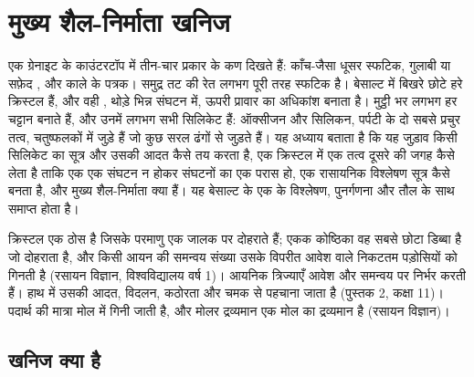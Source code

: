 \chapter{मुख्य शैल-निर्माता खनिज}\label{ch:b1:rock-forming-minerals}

एक ग्रेनाइट के काउंटरटॉप में तीन-चार प्रकार के कण दिखते हैं: काँच-जैसा धूसर स्फटिक, गुलाबी या सफ़ेद ,
और काले  के पत्रक। समुद्र तट की रेत लगभग पूरी तरह स्फटिक है। बेसाल्ट में बिखरे छोटे हरे क्रिस्टल 
हैं, और वही , थोड़े भिन्न संघटन में, ऊपरी प्रावार का अधिकांश बनाता है। मुट्ठी भर  लगभग हर चट्टान
बनाते हैं, और उनमें लगभग सभी सिलिकेट हैं: ऑक्सीजन और सिलिकन, पर्पटी के दो सबसे प्रचुर तत्व, चतुष्फलकों में
जुड़े हैं जो कुछ सरल ढंगों से जुड़ते हैं। यह अध्याय बताता है कि यह जुड़ाव किसी सिलिकेट का सूत्र और उसकी
आदत कैसे तय करता है, एक क्रिस्टल में एक तत्व दूसरे की जगह कैसे लेता है ताकि एक  एक संघटन न होकर संघटनों
का एक परास हो, एक रासायनिक विश्लेषण सूत्र कैसे बनता है, और मुख्य शैल-निर्माता  क्या हैं। यह बेसाल्ट के
एक  के विश्लेषण, पुनर्गणना और तौल के साथ समाप्त होता है।

\begin{recall}
क्रिस्टल एक ठोस है जिसके परमाणु एक जालक पर दोहराते हैं; एकक कोष्ठिका वह सबसे छोटा डिब्बा है जो दोहराता है, और
किसी आयन की समन्वय संख्या उसके विपरीत आवेश वाले निकटतम पड़ोसियों को गिनती है (रसायन विज्ञान, विश्वविद्यालय
वर्ष 1)। आयनिक त्रिज्याएँ आवेश और समन्वय पर निर्भर करती हैं।  हाथ में उसकी आदत, विदलन, कठोरता और चमक से
पहचाना जाता है (पुस्तक 2, कक्षा 11)। पदार्थ की मात्रा मोल में गिनी जाती है, और मोलर द्रव्यमान एक मोल का द्रव्यमान
है (रसायन विज्ञान)।
\end{recall}

\section{खनिज क्या है}

